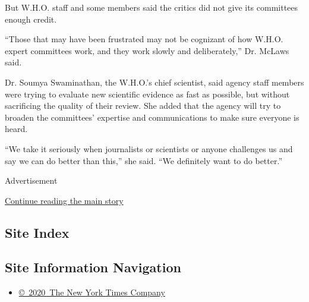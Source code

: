 But W.H.O. staff and some members said the critics did not give its
committees enough credit.

``Those that may have been frustrated may not be cognizant of how W.H.O.
expert committees work, and they work slowly and deliberately,'' Dr.
McLaws said.

Dr. Soumya Swaminathan, the W.H.O.'s chief scientist, said agency staff
members were trying to evaluate new scientific evidence as fast as
possible, but without sacrificing the quality of their review. She added
that the agency will try to broaden the committees' expertise and
communications to make sure everyone is heard.

``We take it seriously when journalists or scientists or anyone
challenges us and say we can do better than this,'' she said. ``We
definitely want to do better.''

Advertisement

\protect\hyperlink{after-bottom}{Continue reading the main story}

\hypertarget{site-index}{%
\subsection{Site Index}\label{site-index}}

\hypertarget{site-information-navigation}{%
\subsection{Site Information
Navigation}\label{site-information-navigation}}

\begin{itemize}
\tightlist
\item
  \href{https://help.nytimes.com/hc/en-us/articles/115014792127-Copyright-notice}{©~2020~The
  New York Times Company}
\end{itemize}

